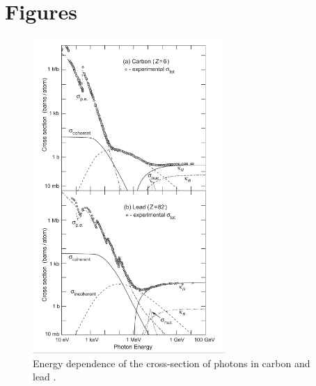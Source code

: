 

\chapter{Figures}


\begin{figure}[H]
	\centering
	\includegraphics[width=0.65\textwidth]{./graphics/ch1/photo_absorption_cross_sections.png}
	\caption[Interaction of phtonos with matter (detailed)]{Energy dependence of the cross-section of photons in carbon and lead \cite{wermes}.}    
	\label{ap:A:photons_detailed}
\end{figure}

\newpage

